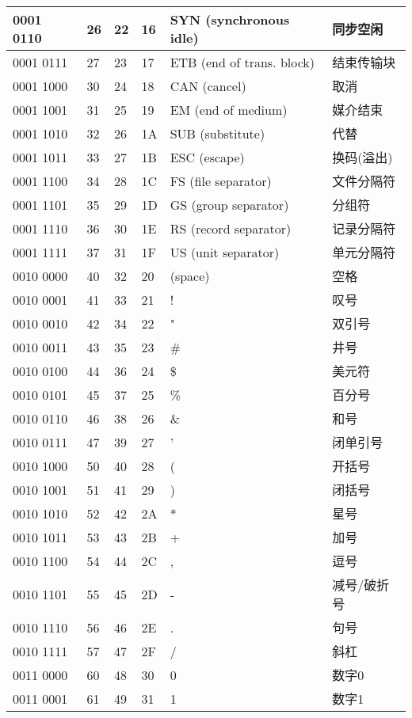 \begin{longtable}{| p{.10\linewidth} | p{.08\linewidth} | p{.08\linewidth} | p{.10\linewidth} | p{.28\linewidth} | p{.15\linewidth} |}
0001 0110 & 26 & 22 & 16 & SYN (synchronous idle) & 同步空闲 \\ \hline
0001 0111 & 27 & 23 & 17 & ETB (end of trans. block) & 结束传输块 \\ \hline
0001 1000 & 30 & 24 & 18 & CAN (cancel) & 取消 \\ \hline
0001 1001 & 31 & 25 & 19 & EM (end of medium) & 媒介结束 \\ \hline
0001 1010 & 32 & 26 & 1A & SUB (substitute) & 代替 \\ \hline
0001 1011 & 33 & 27 & 1B & ESC (escape) & 换码(溢出) \\ \hline
0001 1100 & 34 & 28 & 1C & FS (file separator) & 文件分隔符 \\ \hline
0001 1101 & 35 & 29 & 1D & GS (group separator) & 分组符 \\ \hline
0001 1110 & 36 & 30 & 1E & RS (record separator) & 记录分隔符 \\ \hline
0001 1111 & 37 & 31 & 1F & US (unit separator) & 单元分隔符 \\ \hline
0010 0000 & 40 & 32 & 20 & (space) & 空格 \\ \hline
0010 0001 & 41 & 33 & 21 & ! & 叹号 \\ \hline
0010 0010 & 42 & 34 & 22 & " & 双引号 \\ \hline
0010 0011 & 43 & 35 & 23 & \# & 井号 \\ \hline
0010 0100 & 44 & 36 & 24 & \$ & 美元符 \\ \hline
0010 0101 & 45 & 37 & 25 & \% & 百分号 \\ \hline
0010 0110 & 46 & 38 & 26 & \& & 和号 \\ \hline
0010 0111 & 47 & 39 & 27 & ' & 闭单引号 \\ \hline
0010 1000 & 50 & 40 & 28 & ( & 开括号 \\ \hline
0010 1001 & 51 & 41 & 29 &) & 闭括号 \\ \hline
0010 1010 & 52 & 42 & 2A & * & 星号 \\ \hline
0010 1011 & 53 & 43 & 2B & + & 加号 \\ \hline
0010 1100 & 54 & 44 & 2C & , & 逗号 \\ \hline
0010 1101 & 55 & 45 & 2D & - & 减号/破折号 \\ \hline
0010 1110 & 56 & 46 & 2E & . & 句号 \\ \hline
0010 1111 & 57 & 47 & 2F & / & 斜杠 \\ \hline
0011 0000 & 60 & 48 & 30 & 0 & 数字0 \\ \hline
0011 0001 & 61 & 49 & 31 & 1 & 数字1 \\ \hline

\end{longtable}
